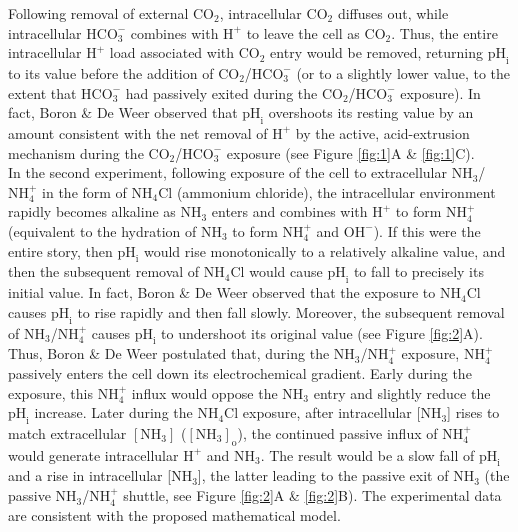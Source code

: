 \documentclass[fleqn,10pt]{physiome}
\begin{document}
\begin{figure}
\end{figure}


Following removal of external $\mathrm{CO_2}$, intracellular $\mathrm{CO_2}$ diffuses out, while intracellular $\mathrm{HCO_3^-}$ combines with $\mathrm{H^+}$ to leave the cell as $\mathrm{CO_2}$. Thus, the entire intracellular $\mathrm{H^+}$ load associated with $\mathrm{CO_2}$ entry would be removed, returning $\mathrm{{pH}_i}$ to its value before the addition of $\mathrm{CO_2}$/$\mathrm{HCO_3^-}$ (or to a slightly lower value, to the extent that $\mathrm{HCO_3^-}$ had passively exited during the $\mathrm{CO_2}$/$\mathrm{HCO_3^-}$ exposure). In fact, Boron \& De Weer observed that $\mathrm{{pH}_i}$ overshoots its resting value by an amount consistent with the net removal of $\mathrm{H^+}$ by the active, acid-extrusion mechanism during the $\mathrm{CO_2}$/$\mathrm{HCO_3^-}$ exposure (see Figure \ref{fig:1}A \& \ref{fig:1}C). \\

In the second experiment, following exposure of the cell to extracellular $\mathrm{NH_3}$/$\mathrm{NH_4^+}$ in the form of $\mathrm{NH_4Cl}$ (ammonium chloride), the intracellular environment rapidly becomes alkaline as $\mathrm{NH_3}$ enters and combines with $\mathrm{H^+}$ to form $\mathrm{NH_4^+}$ (equivalent to the hydration of $\mathrm{NH_3}$ to form $\mathrm{NH_4^+}$ and $\mathrm{OH^-}$). If this were the entire story, then $\mathrm{{pH}_i}$ would rise monotonically to a relatively alkaline value, and then the subsequent removal of $\mathrm{NH_4Cl}$ would cause $\mathrm{{pH}_i}$ to fall to precisely its initial value. In fact, Boron \& De Weer observed that the exposure to $\mathrm{NH_4Cl}$ causes $\mathrm{{pH}_i}$ to rise rapidly and then fall slowly. Moreover, the subsequent removal of $\mathrm{NH_3}$/$\mathrm{NH_4^+}$ causes $\mathrm{{pH}_i}$ to undershoot its original value (see Figure \ref{fig:2}A). Thus, Boron \& De Weer postulated that, during the $\mathrm{NH_3}$/$\mathrm{NH_4^+}$ exposure, $\mathrm{NH_4^+}$ passively enters the cell down its electrochemical gradient. Early during the exposure, this $\mathrm{NH_4^+}$ influx would oppose the $\mathrm{NH_3}$ entry and slightly reduce the $\mathrm{{pH}_i}$ increase. Later during the $\mathrm{NH_4Cl}$ exposure, after intracellular [$\mathrm{NH_3}$] rises to match extracellular $\mathrm{[NH_3]}$ ($\mathrm{[NH_3]_o}$), the continued passive influx of $\mathrm{NH_4^+}$ would generate intracellular $\mathrm{H^+}$ and $\mathrm{NH_3}$. The result would be a slow fall of $\mathrm{{pH}_i}$ and a rise in intracellular [$\mathrm{NH_3}$], the latter leading to the passive exit of $\mathrm{NH_3}$ (the passive $\mathrm{NH_3}$/$\mathrm{NH_4^+}$ shuttle, see Figure \ref{fig:2}A \& \ref{fig:2}B). The experimental data are consistent with the proposed mathematical model.\\
\end{document}
